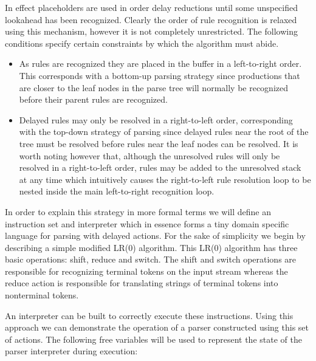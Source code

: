 \documentclass[11pt]{article}
\begin{document}
In effect placeholders are used in order delay reductions until some unspecified lookahead has been recognized.
Clearly the order of rule recognition is relaxed using this mechanism, however it is not completely unrestricted. 
The following conditions specify certain constraints by which the algorithm must abide.

\begin{itemize}
\item As rules are recognized they are placed in the buffer in a left-to-right order. This corresponds with a bottom-up parsing strategy since productions that are closer to the leaf nodes in the parse tree will normally be recognized before their parent rules are recognized.
\item Delayed rules may only be resolved in a right-to-left order, corresponding with the top-down strategy of parsing since delayed rules near the root of the tree must be resolved before 
rules near the leaf nodes can be resolved. 
It is worth noting however that, although the unresolved rules will only be resolved in a right-to-left order, rules may be added to the unresolved stack at any time which intuitively
causes the right-to-left rule resolution loop to be nested inside the main left-to-right recognition loop.
\end{itemize}

In order to explain this strategy in more formal terms we will define an instruction set and interpreter which in essence forms a tiny domain specific language for parsing with delayed actions.
For the sake of simplicity we begin by describing a simple modified LR(0) algorithm. This LR(0) algorithm has three basic operations: shift, reduce and switch. 
The shift and switch operations are responsible for recognizing terminal tokens on the input stream whereas the reduce action is responsible for translating strings of terminal tokens into nonterminal tokens.

An interpreter can be built to correctly execute these instructions. 
Using this approach we can demonstrate the operation of a parser constructed using this set of actions.
The following free variables will be used to represent the state of the parser interpreter during execution:
\end{document}
